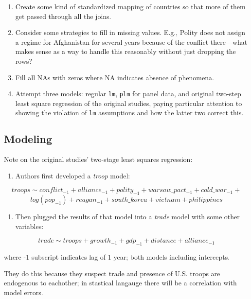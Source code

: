 \documentclass[12pt,]{article}
\providecommand{\tightlist}{%
  \setlength{\itemsep}{0pt}\setlength{\parskip}{0pt}}
\begin{document}
\begin{enumerate}
\def\labelenumi{\arabic{enumi}.}
\item
  Create some kind of standardized mapping of countries so that more of
  them get passed through all the joins.
\item
  Consider some strategies to fill in missing values. E.g., Polity does
  not assign a regime for Afghanistan for several years because of the
  conflict there---what makes sense as a way to handle this reasonably
  without just dropping the rows?
\item
  Fill all NAs with zeros where NA indicates absence of phenomena.
\item
  Attempt three models: regular \texttt{lm}, \texttt{plm} for panel
  data, and original two-step least square regression of the original
  studies, paying particular attention to showing the violation of
  \texttt{lm} assumptions and how the latter two correct this.
\end{enumerate}

\hypertarget{modeling}{%
\subsection{Modeling}\label{modeling}}

Note on the original studies' two-stage least squares regression:

\begin{enumerate}
\def\labelenumi{\arabic{enumi}.}
\tightlist
\item
  Authors first developed a \emph{troop} model:
\end{enumerate}

\[troops \sim conflict_{-1} + alliance_{-1} + polity_{-1} + warsaw\_pact_{-1} + cold\_war_{-1} +\]
\[log(pop_{-1}) + reagan_{-1} + south\_korea + vietnam + philippines\]

\begin{enumerate}
\def\labelenumi{\arabic{enumi}.}
\setcounter{enumi}{1}
\tightlist
\item
  Then plugged the results of that model into a \emph{trade} model with
  some other variables:
\end{enumerate}

\[trade \sim troops + growth_{-1} + gdp_{-1} + distance + alliance_{-1}\]

where -1 subscript indicates lag of 1 year; both models including
intercepts.

They do this because they suspect trade and presence of U.S. troops are
endogenous to eachother; in stastical langauge there will be a
correlation with model errors.
\end{document}
